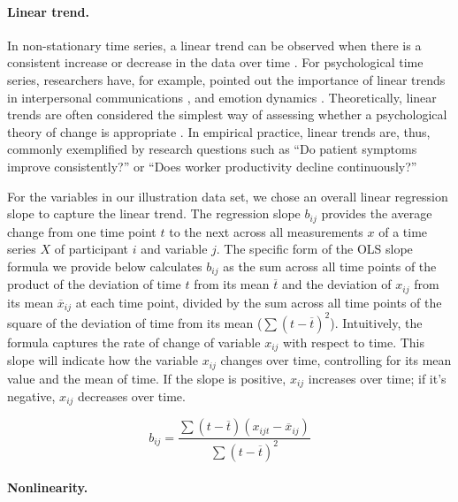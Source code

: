 \paragraph{Linear trend.}

In non-stationary time series, a linear trend can be observed when there
is a consistent increase or decrease in the data over time
\citep{nyblom1986}. For psychological time series, researchers have, for
example, pointed out the importance of linear trends in interpersonal
communications \citep{vasileiadou2014}, and emotion dynamics
\citep{oravecz2016}. Theoretically, linear trends are often considered
the simplest way of assessing whether a psychological theory of change
is appropriate \citep{gottman1969}. In empirical practice, linear trends
are, thus, commonly exemplified by research questions such as ``Do
patient symptoms improve consistently?'' or ``Does worker productivity
decline continuously?''

For the variables in our illustration data set, we chose an overall
linear regression slope to capture the linear trend. The regression
slope \(b_{ij}\) provides the average change from one time point \(t\)
to the next across all measurements \(x\) of a time series \(X\) of
participant \(i\) and variable \(j\). The specific form of the OLS slope
formula we provide below calculates \(b_{ij}\) as the sum across all
time points of the product of the deviation of time \(t\) from its mean
\(\overline{t}\) and the deviation of \(x_{ij}\) from its mean
\(\overline{x}_{ij}\) at each time point, divided by the sum across all
time points of the square of the deviation of time from its mean
(\(\sum(t-\overline{t})^2\)). Intuitively, the formula captures the rate
of change of variable \(x_{ij}\) with respect to time. This slope will
indicate how the variable \(x_{ij}\) changes over time, controlling for
its mean value and the mean of time. If the slope is positive,
\(x_{ij}\) increases over time; if it's negative, \(x_{ij}\) decreases
over time.

\begin{equation} \label{eq:lin}
  b_{ij} = \frac{\sum(t-\overline{t})(x_{ijt}-\overline{x}_{ij})}{\sum(t-\overline{t})^2}
\end{equation}

\paragraph{Nonlinearity.}

